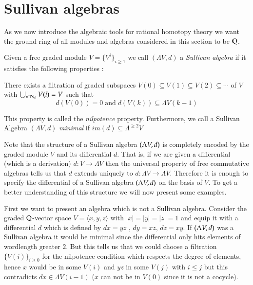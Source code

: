 
\section{Sullivan algebras}
As we now introduce the algebraic tools for rational homotopy theory we want the ground ring of all modules and algebras
considered in this section to be $\mathbb{Q}$.

\begin{Definition}
 Given a free graded module $V = {\lbrace {V^i}\rbrace}_{ i \geq 1} $ we call $(\Lambda V, d)$ a \emph{Sullivan algebra} 
 if it satisfies the following properties :
 
  There exists a filtration of graded subspaces $V(0) \subseteq V(1) \subseteq V(2) \subseteq \cdots $ of $V$
  with $\bigcup_{i \in \mathbb{N}_0} V(i) = V$ such that 
  $$ d(V(0)) = 0 \; \text{and} \; d( V(k)) \subseteq  \Lambda V(k-1) $$
  
 This property is called the \emph{nilpotence} property.
 Furthermore, we call a Sullivan Algebra $(\Lambda V,d)$ \emph{minimal} if $im(d) \subseteq \Lambda^{\geq 2} V$
\end{Definition}

Note that the structure of a Sullivan algebra $(\Lambda V,d)$ is completely encoded by the graded module $V$ and its
differential $d$. That is, if we are given a differential (which is a derivation) $d \colon V \to \Lambda V$ then the
universal property of free commutative algebras tells us that $d$ extends uniquely to $d \colon \Lambda V \to \Lambda V$.
Therefore it is enough to specify the differential of a Sullivan algebra $(\Lambda V,d)$ on the basis of $V$.
To get a better understanding of this structure we will now present some examples.

\begin{Example}
 First we want to present an algebra which is not a Sullivan algebra. 
 Consider the graded $\mathbb{Q}$-vector space $V = \langle x,y,z \rangle$ with $|x| = |y| = |z| = 1$ and 
 equip it with a differential $d$ which is defined by $dx = yz$ , $dy = xz$, $dz = xy$. \newline
 If $(\Lambda V,d)$ was a Sullivan algebra it would be minimal since 
 the differential only hits elements of wordlength greater $2$. But this tells us that we could choose a filtration 
 ${\lbrace V(i) \rbrace}_{i \geq 0}$ for
 the nilpotence condition which respects the degree of elements, hence $ x $ would be in some $V(i)$ and $yz$ in some $V(j)$
 with $i \leq j$ but this contradicts $dx \in \Lambda V(i-1)$ ($x$ can not be in $V(0)$ since it is not a cocycle).
 
\end{Example}

